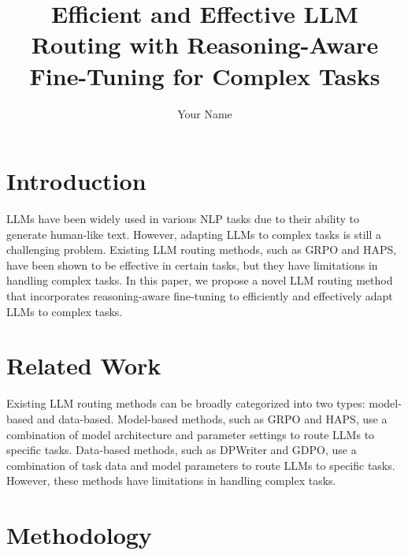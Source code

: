 \documentclass{article}
\begin{document}
\title{Efficient and Effective LLM Routing with Reasoning-Aware Fine-Tuning for Complex Tasks}

\author{Your Name}

\maketitle


\section{Introduction}

LLMs have been widely used in various NLP tasks due to their ability to generate human-like text. However, adapting LLMs to complex tasks is still a challenging problem. Existing LLM routing methods, such as GRPO and HAPS, have been shown to be effective in certain tasks, but they have limitations in handling complex tasks. In this paper, we propose a novel LLM routing method that incorporates reasoning-aware fine-tuning to efficiently and effectively adapt LLMs to complex tasks.

\section{Related Work}

Existing LLM routing methods can be broadly categorized into two types: model-based and data-based. Model-based methods, such as GRPO and HAPS, use a combination of model architecture and parameter settings to route LLMs to specific tasks. Data-based methods, such as DPWriter and GDPO, use a combination of task data and model parameters to route LLMs to specific tasks. However, these methods have limitations in handling complex tasks.

\section{Methodology}
\end{document}
